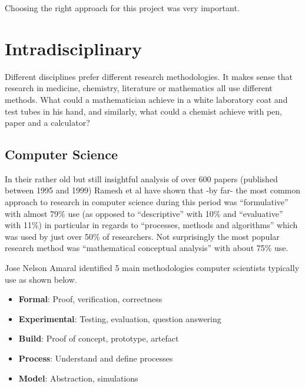 
Choosing the right approach for this project was very important.




\section{Intradisciplinary}

Different disciplines prefer different research methodologies. It makes sense that research in medicine, chemistry, literature or mathematics all use different methods. What could a mathematician achieve in a white laboratory coat and test tubes in his hand, and similarly, what could a chemist achieve with pen, paper and a calculator?


\subsection{Computer Science}

In their rather old but still insightful analysis of over 600 papers (published between 1995 and 1999) Ramesh et al \autocite{Ramesh2004} have shown that -by far- the most common approach to research in computer science during this period was ``formulative'' with almost 79\% use (as opposed to ``descriptive'' with 10\% and ``evaluative'' with 11\%) in particular in regards to ``processes, methods and algorithms'' which was used by just over 50\% of researchers. Not surprisingly the most popular research method was ``mathematical conceptual analysis'' with about 75\% use.

Jose Nelson Amaral identified 5 main methodologies computer scientists typically use \autocite{Amaral} as shown below.

\begin{itemize}
  \item \textbf{Formal}: Proof, verification, correctness
  \item \textbf{Experimental}: Testing, evaluation, question answering
  \item \textbf{Build}: Proof of concept, prototype, artefact
  \item \textbf{Process}: Understand and define processes
  \item \textbf{Model}: Abstraction, simulations
\end{itemize}

